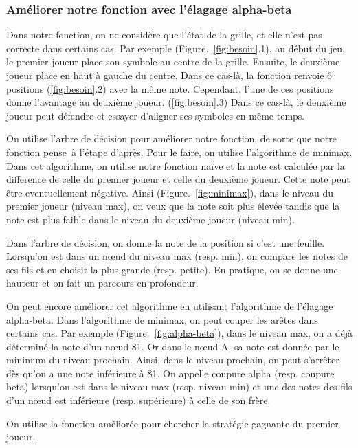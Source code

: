 \documentclass[12pt, a4paper]{article}
\begin{document}
\subsubsection{Améliorer notre fonction avec l'élagage alpha-beta}
Dans notre fonction, on ne considère que l'état de la grille, et elle n'est pas correcte dans certains cas. Par exemple (\mbox{Figure. \ref{fig:besoin}.1}), au début du jeu, le premier joueur place son symbole au centre de la grille. Ensuite, le deuxième joueur place en haut à gauche du centre. Dans ce cas-là, la fonction renvoie 6 positions (\ref{fig:besoin}.2) avec la même note. Cependant, l'une de ces positions donne l'avantage au deuxième joueur. (\ref{fig:besoin}.3) Dans ce cas-là, le deuxième joueur peut défendre et essayer d'aligner ses symboles en même temps. 
\par
On utilise l'arbre de décision pour améliorer notre fonction, de sorte que notre fonction \og pense\fg \ à l'étape d'après. Pour le faire, on utilise l'algorithme de minimax. Dans cet algorithme, on utilise notre fonction naïve et la note est calculée par la difference de celle du premier joueur et celle du deuxième joueur. Cette note peut être eventuellement négative. Ainsi (\mbox{Figure. \ref{fig:minimax}}), dans le niveau du premier joueur (niveau max), on veux que la note soit plus élevée tandis que la note est plus faible dans le niveau du deuxième joueur (niveau min).

Dans l'arbre de décision, on donne la note de la position si c'est une feuille. Lorsqu'on est dans un nœud du niveau max (resp. min), on compare les notes de ses fils et en choisit la plus grande (resp. petite). En pratique, on se donne une hauteur et on fait un parcours en profondeur.\par
On peut encore améliorer cet algorithme en utilisant l'algorithme de l'élagage alpha-beta. Dans l'algorithme de minimax, on peut couper les arêtes dans certains cas. Par exemple (\mbox{Figure. \ref{fig:alpha-beta}}), dans le niveau max, on a déjà déterminé la note d'un nœud 81. Or dans le nœud A, sa note est donnée par le minimum du niveau prochain. Ainsi, dans le niveau prochain, on peut s'arrêter dès qu'on a une note inférieure à 81. On appelle coupure alpha (resp. coupure beta) lorsqu'on est dans le niveau max (resp. niveau min) et une des notes des fils d'un nœud est inférieure (resp. supérieure) à celle de son frère.\par
On utilise la fonction améliorée pour chercher la stratégie gagnante du premier joueur.
\end{document}
